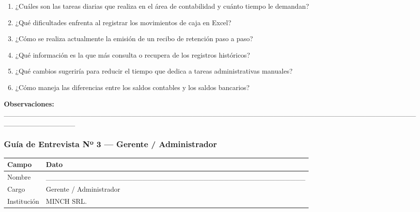 \documentclass[stu]{apa7}
\begin{document}
\vspace{0.3cm}

\begin{enumerate}
    \item ¿Cuáles son las tareas diarias que realiza en el área de contabilidad y cuánto tiempo le demandan?

    \item ¿Qué dificultades enfrenta al registrar los movimientos de caja en Excel?

    \item ¿Cómo se realiza actualmente la emisión de un recibo de retención paso a paso?

    \item ¿Qué información es la que más consulta o recupera de los registros históricos?

    \item ¿Qué cambios sugeriría para reducir el tiempo que dedica a tareas administrativas manuales?

    \item ¿Cómo maneja las diferencias entre los saldos contables y los saldos bancarios?
\end{enumerate}

\vspace{0.3cm}

\textbf{Observaciones:} \_\_\_\_\_\_\_\_\_\_\_\_\_\_\_\_\_\_\_\_\_\_\_\_\_\_\_\_\_\_\_\_\_\_\_\_\_\_\_\_\_\_\_\_\_\_\_\_\_\_\_\_\_\_\_\_\_\_\_\_\_\_\_\_\_\_\_\_\_\_\_\_\_\_\_\_\_\_\_\_\_\_\_\_\_\_\_\_\_\_\_\_\_\_\_

\newpage

\subsubsection{Guía de Entrevista Nº 3 --- Gerente / Administrador}

\begin{tabularx}{\textwidth}{|l|X|}
\hline
\rowcolor[gray]{0.9}
\textbf{Campo} & \textbf{Dato} \\
\hline
Nombre & \_\_\_\_\_\_\_\_\_\_\_\_\_\_\_\_\_\_\_\_\_\_\_\_\_\_\_\_\_\_\_\_\_\_\_\_\_\_\_\_\_\_\_\_\_\_\_\_\_\_\_ \\
\hline
Cargo & Gerente / Administrador \\
\hline
Institución & MINCH SRL. \\
\hline
\end{tabularx}

\vspace{0.3cm}
\end{document}
